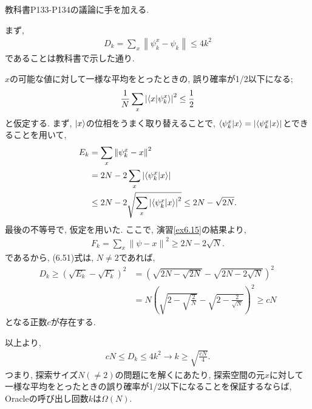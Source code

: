 \begin{ex}
    \label{ex6.16}
    教科書P133-P134の議論に手を加える.
    \par
    まず,
    \begin{align*}
        D_k
        = \sum_x \left\|  \psi_k^x - \psi_k \right\|
        \leq 4k^2
    \end{align*}
    であることは教科書で示した通り.
    \par
    $x$の可能な値に対して一様な平均をとったときの, 誤り確率が1/2以下になる;
    \begin{align*}
        \frac{1}{N} \sum_x \left| \braket{x|\psi_k^x} \right|^2 \leq \frac{1}{2}
    \end{align*}
    と仮定する. まず, $\ket{x}$の位相をうまく取り替えることで, $\braket{\psi_k^x|x} = \left| \braket{\psi_k^x|x} \right|$とできることを用いて,
    \begin{align*}
        E_k
         & = \sum_x \left\| \psi_k^x - x \right\|^2
        \\
         & = 2N - 2 \sum_x \left| \braket{\psi_k^x|x} \right|
        \\
         &
        \leq
        2N - 2 \sqrt{\sum_x \left| \braket{\psi_k^x|x} \right|^2}
        \leq
        2N -  \sqrt{2N}.
    \end{align*}
    最後の不等号で, 仮定を用いた.
    ここで, 演習\ref{ex6.15}の結果より,
    \begin{align*}
        F_k = \sum_x \left\| \psi - x \right\|^2
        \geq 2N - 2\sqrt{N}.
    \end{align*}
    であるから, (6.51)式は, $N \neq 2$であれば,
    \begin{align*}
        D_k \geq \left( \sqrt{E_k} - \sqrt{F_k} \right)^2
         & =
        \left( \sqrt{2N -  \sqrt{2N}} - \sqrt{2N - 2\sqrt{N}} \right)^2
        \\
         & =
        N \left( \sqrt{2 -  \sqrt{\frac{2}{N}}} - \sqrt{2 - \frac{2}{\sqrt{N}}} \right)^2
        \geq cN
    \end{align*}
    となる正数$c$が存在する.
    \par
    以上より,
    \begin{align*}
        cN \leq D_k \leq 4k^2 \to k \geq \sqrt{\frac{cN}{4}}.
    \end{align*}
    つまり, 探索サイズ$N(\neq2)$の問題にを解くにあたり, 探索空間の元$x$に対して一様な平均をとったときの誤り確率が1/2以下になることを保証するならば, Oracleの呼び出し回数$k$は$\Omega(N)$.
\end{ex}

